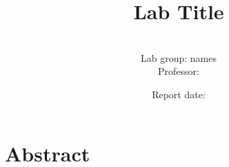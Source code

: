 \documentclass[12pt,letterpaper,twoside]{article}
\title{Lab Title}
\author{\studentname \\
Lab group: names\\
Professor: }
\date{Report date: \reportdate}
\begin{document}
\maketitle

\section{Abstract}
\end{document}
